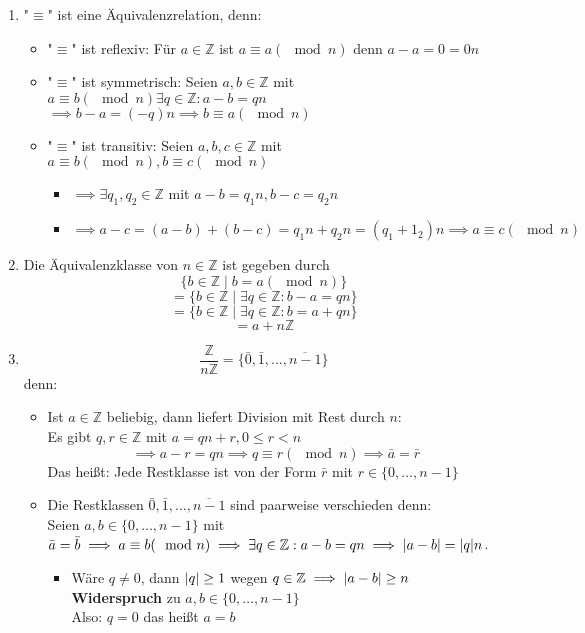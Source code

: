 \documentclass[a4paper]{scrartcl}
\DeclarePairedDelimiter\abs{\lvert}{\rvert}%
\theoremstyle{definition}
\theoremstyle{plain}
\theoremstyle{plain}
\theoremstyle{remark}
\theoremstyle{remark}
\theoremstyle{remark}
\theoremstyle{remark}
\theoremstyle{remark}
\begin{document}
\begin{enumerate}
\item "$\equiv$" ist eine Äquivalenzrelation, denn:
\begin{itemize}
\item "$\equiv$" ist reflexiv: Für $a\in\mathbb{Z}$ ist $a\equiv a(\mod n)$ denn $a - a = 0 = 0 n$
\item "$\equiv$" ist symmetrisch: Seien $a,b\in\mathbb{Z}$ mit $a\equiv b(\mod n) \exists q\in\mathbb{Z}:a - b = q n$ \\
           $\implies b - a = (-q) n \implies b \equiv a(\mod n)$
\item "$\equiv$" ist transitiv: Seien $a,b,c\in\mathbb{Z}$ mit $a\equiv b(\mod n), b\equiv c(\mod n)$
\begin{itemize}
\item $\implies \exists q_1,q_2 \in\mathbb{Z}$ mit $a - b = q_1 n, b - c = q_2 n$
\item $\implies a - c = (a - b) + (b - c) = q_1 n + q_2 n = (q_1 + 1_2) n \implies a \equiv c(\mod n)$
\end{itemize}
\end{itemize}
\item Die Äquivalenzklasse von $n\in\mathbb{Z}$ ist gegeben durch
\[\{b\in\mathbb{Z} \mid b = a(\mod n)\}\]
\[= \{b\in\mathbb{Z} \mid \exists q\in\mathbb{Z}:b - a = qn\}\]
\[= \{b\in\mathbb{Z} \mid \exists q\in\mathbb{Z}:b = a + q n\}\]
\[= a + n\mathbb{Z} \]
\item \[\frac{\mathbb{Z}}{n\mathbb{Z}} = \{\bar 0, \bar 1, \ldots, \overline{n - 1}\}\]
         denn:
\begin{itemize}
\item Ist $a\in\mathbb{Z}$ beliebig, dann liefert Division mit Rest durch $n$: \\
           Es gibt $q,r\in\mathbb{Z}$ mit $a = q n + r,0\leq r < n$
           \[\implies a - r = q n \implies q \equiv r(\mod n) \implies \bar a = \bar r\]
           Das heißt: Jede Restklasse ist von der Form $\bar r$ mit $r\in \{0,\ldots,n - 1\}$ \\
\item Die Restklassen $\bar 0, \bar 1, \ldots, \overline{n - 1}$ sind paarweise verschieden denn: \\
           Seien $a,b\in\{0,\ldots,n - 1\}$ mit $\bar a = \bar b \implies a \equiv b(\mod n) \implies \exists q\in \mathbb{Z}: a - b = q n \implies \abs{a - b} = \abs{q} n$.
\begin{itemize}
\item Wäre $q\neq 0$, dann $\abs{q} \geq 1$ wegen $q\in\mathbb{Z} \implies \abs{a - b} \geq n$ \textbf{Widerspruch} zu $a,b\in\{0,\ldots,n - 1\}$ \\
             Also: $q = 0$ das heißt $a = b$
\end{itemize}
\end{itemize}
\end{enumerate}
\end{document}

